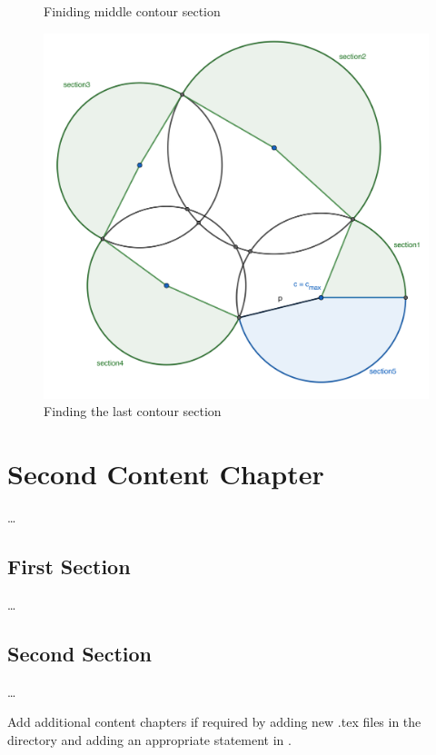\begin{figure}[!htb]
    \caption{Finiding middle contour section}\label{fig:contour2}
  \endminipage\hfill
    \includegraphics[width=1.0\textwidth]{figures/contour/c3copy.pdf}
    \caption{Finding the last contour section}\label{fig:contour3}
  \endminipage
\end{figure}



\chapter{Second Content Chapter}
\label{ch:SecondContent}

\dots

\section{First Section}
\label{sec:SecondContent:FirstSection}

\dots

\section{Second Section}
\label{sec:SecondContent:SecondSection}

\dots

Add additional content chapters if required by adding new .tex files in the
 directory and adding an appropriate 
 statement in . 
